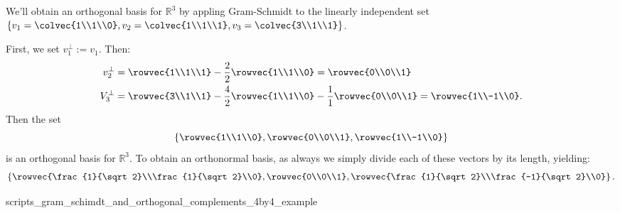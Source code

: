 \begin{example}
We'll  obtain an orthogonal basis for $\mathbb{R}^3$ by appling Gram-Schmidt to the linearly independent set 
$\left\{ v_1=\colvec{1\\1\\0}, v_2=\colvec{1\\1\\1},v_3=\colvec{3\\1\\1} \right\}$.

First, we set $v_1^\perp:=v_1$.  Then:
\begin{align*}
v_2^\perp&= \rowvec{1\\1\\1} - \frac{2}{2}\rowvec{1\\1\\0} = \rowvec{0\\0\\1} \\
V_3^\perp&= \rowvec{3\\1\\1} - \frac{4}{2}\rowvec{1\\1\\0} - \frac{1}{1}\rowvec{0\\0\\1} = \rowvec{1\\-1\\0}. 
\end{align*}
Then the set
\[
\left\{ \rowvec{1\\1\\0},\rowvec{0\\0\\1},\rowvec{1\\-1\\0}\right\}
\]
is an orthogonal basis for $\mathbb{R}^3$.  To obtain an orthonormal basis, as always we simply divide each of these vectors by its length, yielding:
\[
\left\{ \rowvec{\frac{1}{\sqrt2}\\\frac{1}{\sqrt2}\\0},\rowvec{0\\0\\1},\rowvec{\frac{1}{\sqrt2}\\\frac{-1}{\sqrt2}\\0}\right\}.
\]
\end{example}

 {scripts_gram_schimdt_and_orthogonal_complements_4by4_example}

